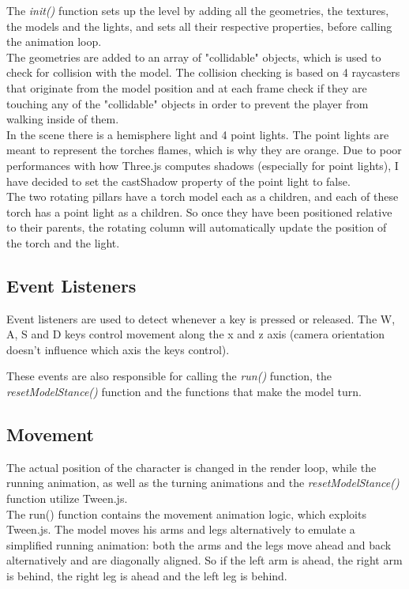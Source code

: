 \documentclass[14pt]{article}
\begin{document}
The  \textit{init()} function sets up the level by adding all the geometries, the textures, the models and the lights,  and sets all their respective properties, before calling the animation loop.
\\

The geometries are added to an array of "collidable" objects, which is used to check for collision with the model. The collision checking is based on 4 raycasters that originate from the model position and at each frame check if they are touching any of the "collidable" objects in order to prevent the player from walking inside of them.
\\


In the scene there is a hemisphere light and 4 point lights. The point lights are meant to represent the torches flames, which is why they are orange. Due to poor performances with how Three.js computes shadows (especially for point lights), I have decided to set the castShadow property of the point light to false.
\\


The two rotating pillars have a torch model each as a children, and each of these torch has a point light as a children. So once they have been positioned relative to their parents, the rotating column will automatically update the position of the torch and the light.


\subsection{Event Listeners}
Event listeners are used to detect whenever a key is pressed or released. The W, A, S and D keys control movement along the x and z axis (camera orientation doesn't influence which axis the keys control). 

These events are also responsible for calling the  \textit{run()} function, the  \textit{resetModelStance()} function and the functions that make the model turn.

\subsection{Movement}
The actual position of the character is changed in the render loop, while the running animation, as well as the turning animations and the  \textit{resetModelStance()} function utilize Tween.js.
\\

The run() function contains the movement animation logic, which exploits Tween.js. The model moves his arms and legs alternatively to emulate a simplified running animation: both the arms and the legs move ahead and back alternatively and are diagonally aligned. So if the left arm is ahead, the right arm is behind, the right leg is ahead and the left leg is behind. 
\\
\end{document}
